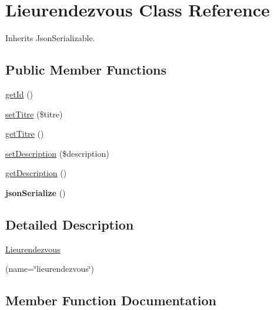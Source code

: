 \hypertarget{class_site_1_1_trail_bundle_1_1_entity_1_1_lieurendezvous}{}\section{Lieurendezvous Class Reference}
\label{class_site_1_1_trail_bundle_1_1_entity_1_1_lieurendezvous}


Inherits Json\+Serializable.

\subsection*{Public Member Functions}
\begin{DoxyCompactItemize}
\item 
\hyperlink{class_site_1_1_trail_bundle_1_1_entity_1_1_lieurendezvous_a12251d0c022e9e21c137a105ff683f13}{get\+Id} ()
\item 
\hyperlink{class_site_1_1_trail_bundle_1_1_entity_1_1_lieurendezvous_a1d7b0177b6a719345b3a99ec2b48c5a0}{set\+Titre} (\$titre)
\item 
\hyperlink{class_site_1_1_trail_bundle_1_1_entity_1_1_lieurendezvous_a11c380e71778af9871c5bd84b2f50eae}{get\+Titre} ()
\item 
\hyperlink{class_site_1_1_trail_bundle_1_1_entity_1_1_lieurendezvous_a31fad3e39336ea079ea758e051866627}{set\+Description} (\$description)
\item 
\hyperlink{class_site_1_1_trail_bundle_1_1_entity_1_1_lieurendezvous_a2e7bb35c71bf1824456ceb944cb7a845}{get\+Description} ()
\item 
\hypertarget{class_site_1_1_trail_bundle_1_1_entity_1_1_lieurendezvous_ad402d8679325bc514874370f02b5c2ac}{}{\bfseries json\+Serialize} ()\label{class_site_1_1_trail_bundle_1_1_entity_1_1_lieurendezvous_ad402d8679325bc514874370f02b5c2ac}

\end{DoxyCompactItemize}


\subsection{Detailed Description}
\hyperlink{class_site_1_1_trail_bundle_1_1_entity_1_1_lieurendezvous}{Lieurendezvous}

(name=\char`\"{}lieurendezvous\char`\"{})  

\subsection{Member Function Documentation}
\hypertarget{class_site_1_1_trail_bundle_1_1_entity_1_1_lieurendezvous_a2e7bb35c71bf1824456ceb944cb7a845}{}
